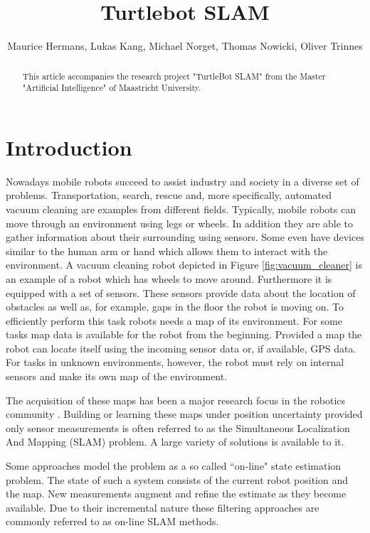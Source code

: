 \documentclass{ba-kecs}
\title{Turtlebot SLAM }
\author{Maurice Hermans, Lukas Kang, Michael Norget, Thomas Nowicki, Oliver Trinnes}
\begin{document}
\maketitle

\begin{abstract}
This article accompanies the research project "TurtleBot SLAM" from the Master "Artificial Intelligence" of Maastricht University.
\end{abstract}

\section{Introduction}
\label{sec:intro}
Nowadays mobile robots succeed to assist industry and society in a diverse set of problems. Transportation, search, rescue and, more specifically, automated vacuum cleaning are examples from different fields. Typically, mobile robots can move through an environment using legs or wheels. In addition they are able to gather information about their surrounding using sensors. Some even have devices similar to the human arm or hand which allows them to interact with the environment. A vacuum cleaning robot depicted in Figure \ref{fig:vacuum_cleaner} is an example of a robot which has wheels to move around. Furthermore it is equipped with a set of sensors. These sensors provide data about the location of obstacles as well as, for example, gaps in the floor the robot is moving on. To efficiently perform this task robots needs a map of its environment. For some tasks map data is available for the robot from the beginning. Provided a map the robot can locate itself using the incoming sensor data or, if available, GPS data. For tasks in unknown environments, however, the robot must rely on internal sensors and make its own map of the environment.

The acquisition of these maps has been a major research focus in the robotics community \cite{ Grisetti, Montemerlo02, Montemerlo, Thrun}. Building or learning these maps under position uncertainty provided only sensor measurements is often referred to as the Simultaneous Localization And Mapping (SLAM) problem. A large variety of solutions is available to it.

Some approaches model the problem as a so called ``on-line" state estimation problem. The state of such a system consists of the current robot position and the map. New measurements augment and refine the estimate as they become available. Due to their incremental nature these filtering approaches are commonly referred to as on-line SLAM methods. 
\end{document}
